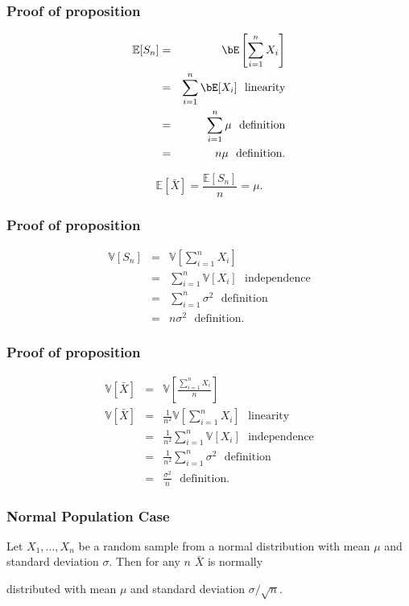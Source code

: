 \begin{frame}[fragile]\frametitle{Proof of proposition}

\begin{eqnarray*}
\mathbb E[S_n] & = & \bE\left[\sum_{i=1}^n X_i \right] \\ 
& = &  \sum_{i=1}^n \bE [X_i] \, \, \, \, \mbox{linearity} \\ 
& = & \sum_{i=1}^n \mu \, \, \, \, \mbox{definition} \\
& = & n \mu \, \, \, \, \mbox{definition}. 
\end{eqnarray*}


$$\mathbb E[\bar{X}] = \frac{\mathbb E[S_n]}{n} = \mu.$$


\end{frame}


\begin{frame}[fragile]\frametitle{Proof of proposition}

\begin{eqnarray*}
\mathbb V[S_n] & = & \mathbb V\left[\sum_{i=1}^n X_i \right] \\ 
& = &  \sum_{i=1}^n \mathbb V [X_i] \, \, \, \, \mbox{independence} \\ 
& = & \sum_{i=1}^n \sigma^2 \, \, \, \, \mbox{definition} \\
& = & n \sigma^2 \, \, \, \, \mbox{definition}. 
\end{eqnarray*}

\end{frame}

\begin{frame}[fragile]\frametitle{Proof of proposition}

\begin{eqnarray*}
\mathbb V[\bar{X}] & = & \mathbb V \left[\frac{\sum_{i=1}^n X_i}{n} \right] \\
\mathbb V[\bar{X}] & = & \frac{1}{n^2} \mathbb V\left[\sum_{i=1}^n X_i\right] \,
\, \, \, \mbox{linearity}\\
& = &  \frac{1}{n^2}\sum_{i=1}^n \mathbb V [X_i] \, \, \, \, \mbox{independence} \\
& = & \frac{1}{n^2} \sum_{i=1}^n \sigma^2 \, \, \, \, \mbox{definition} \\
& = & \frac{\sigma^2}{n} \, \, \, \, \mbox{definition}. 
\end{eqnarray*}
\end{frame}



\begin{frame}[fragile]\frametitle{Normal Population Case}

\begin{prop}

Let $X_1,...,X_n$ be a random sample from a normal
distribution with mean $\mu$ and standard deviation
$\sigma$.  Then for any $n$ $\bar{X}$ is normally

distributed with mean $\mu$ and 
standard deviation $\sigma/\sqrt{n}$.
\end{prop}
\end{frame}



